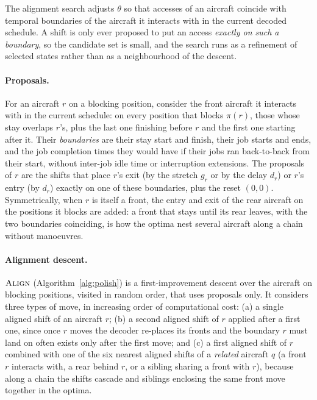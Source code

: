 The alignment search adjusts $\theta$ so that accesses of an aircraft
coincide with temporal boundaries of the aircraft it interacts with in
the current decoded schedule.  A shift is only ever proposed to put an
access \emph{exactly on such a boundary}, so the candidate set is small,
and the search runs as a refinement of selected states rather than as a
neighbourhood of the descent.

\paragraph{Proposals.}
For an aircraft $r$ on a blocking position, consider the front aircraft
it interacts with in the current schedule: on every position that blocks
$\pi(r)$, those whose stay overlaps $r$'s, plus the last one finishing
before $r$ and the first one starting after it.  Their \emph{boundaries}
are their stay start and finish, their job starts and ends, and the job
completion times they would have if their jobs ran back-to-back from
their start, without inter-job idle time or interruption extensions.  The proposals of $r$ are the shifts that place $r$'s exit (by the
stretch $g_r$ or by the delay $d_r$) or $r$'s entry (by $d_r$) exactly on
one of these boundaries, plus the reset $(0,0)$.  Symmetrically, when $r$
is itself a front, the entry and exit of the rear aircraft on the
positions it blocks are added: a front that stays until its rear leaves,
with the two boundaries coinciding, is how the optima nest several
aircraft along a chain without manoeuvres.

\paragraph{Alignment descent.}
$\textsc{Align}$ (Algorithm~\ref{alg:polish}) is a first-improvement
descent over the aircraft on blocking positions, visited in random order,
that uses proposals only.  It considers three types of move, in
increasing order of computational cost: (a) a single aligned shift of an
aircraft $r$; (b) a second aligned shift of $r$ applied after a first
one, since once $r$ moves the decoder re-places its fronts and the
boundary $r$ must land on often exists only after the first move; and
(c) a first aligned shift of $r$ combined with one of the six nearest
aligned shifts of a \emph{related} aircraft $q$ (a front $r$ interacts
with, a rear behind $r$, or a sibling sharing a front with $r$), because
along a chain the shifts cascade and siblings enclosing the same front
move together in the optima.

